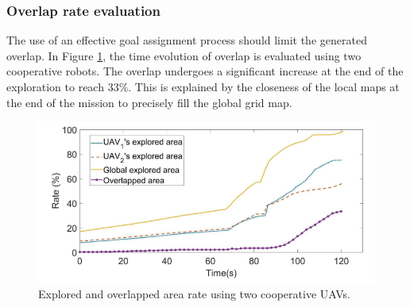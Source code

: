 \documentclass[11pt,openany]{book}
\begin{document}
\subsubsection{Overlap rate evaluation}
The use of an eﬀective goal assignment process should limit the generated overlap. In Figure \ref{fig:3.19}, the time evolution of overlap is evaluated using two cooperative robots. The overlap undergoes a signiﬁcant increase at the end of the exploration to reach $33\%$. This is explained by the closeness of the local maps at the end of the mission to precisely ﬁll the global grid map.
\begin{figure}[H]
    \centering
    \includegraphics[scale=0.4]{assets/3_19.png}
    \caption{Explored and overlapped area rate using two cooperative UAVs.}
    \label{fig:3.19}
\end{figure}
\end{document}

